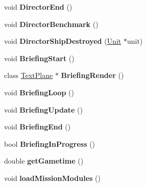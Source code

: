\begin{DoxyCompactItemize}
\item 
void {\bfseries Director\+End} ()\hypertarget{classMission_ada1f81ed36cea256e5d9daa518999f46}{}\label{classMission_ada1f81ed36cea256e5d9daa518999f46}

\item 
void {\bfseries Director\+Benchmark} ()\hypertarget{classMission_a3efa1fe17494f41ed09683b6a3a88455}{}\label{classMission_a3efa1fe17494f41ed09683b6a3a88455}

\item 
void {\bfseries Director\+Ship\+Destroyed} (\hyperlink{classUnit}{Unit} $\ast$unit)\hypertarget{classMission_aba3dea7a545e1f77669970b9f9c353f7}{}\label{classMission_aba3dea7a545e1f77669970b9f9c353f7}

\item 
void {\bfseries Briefing\+Start} ()\hypertarget{classMission_af9b83fa54826894c849e7cc099ac508a}{}\label{classMission_af9b83fa54826894c849e7cc099ac508a}

\item 
class \hyperlink{classTextPlane}{Text\+Plane} $\ast$ {\bfseries Briefing\+Render} ()\hypertarget{classMission_a1f1014adefdf648144ed96aa88c785b7}{}\label{classMission_a1f1014adefdf648144ed96aa88c785b7}

\item 
void {\bfseries Briefing\+Loop} ()\hypertarget{classMission_a7c8320cb568dd2c0a79fb387012b7360}{}\label{classMission_a7c8320cb568dd2c0a79fb387012b7360}

\item 
void {\bfseries Briefing\+Update} ()\hypertarget{classMission_a83a4452635e98a536a991d655e3c7b85}{}\label{classMission_a83a4452635e98a536a991d655e3c7b85}

\item 
void {\bfseries Briefing\+End} ()\hypertarget{classMission_afd5b0c3ad9057c521327186e95d397fa}{}\label{classMission_afd5b0c3ad9057c521327186e95d397fa}

\item 
bool {\bfseries Briefing\+In\+Progress} ()\hypertarget{classMission_ad4299932825d67e0622f334b73af2a73}{}\label{classMission_ad4299932825d67e0622f334b73af2a73}

\item 
double {\bfseries get\+Gametime} ()\hypertarget{classMission_ae21a07a3470f7369f5a39b5f4f0446b9}{}\label{classMission_ae21a07a3470f7369f5a39b5f4f0446b9}

\item 
void {\bfseries load\+Mission\+Modules} ()\hypertarget{classMission_a9d0a986cff2e1f3161828651f2645150}{}\label{classMission_a9d0a986cff2e1f3161828651f2645150}


\end{DoxyCompactItemize}
